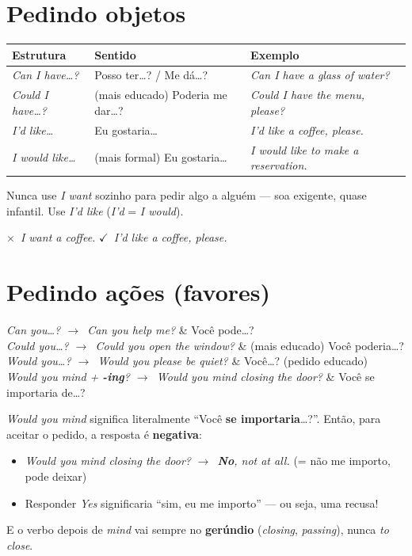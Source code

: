 \documentclass[12pt,a4paper,oneside]{book}
\makeatletter
\newcommand{\en}[1]{\textit{#1}}                 %
\newcommand{\ok}{\textcolor{green!45!black}{$\checkmark$}}
\newcommand{\no}{\textcolor{red!70!black}{$\times$}}
\newcommand{\ra}{$\rightarrow$}
\newcommand{\fr}[2]{\en{#1} & #2 \\}
\newenvironment{frases}{\tabularx{\textwidth}{@{}>{\raggedright\arraybackslash}p{0.52\textwidth}X@{}}}{\endtabularx}
\makeatother
\begin{document}
\section{Pedindo objetos}

\begin{center}
\begin{tabularx}{\textwidth}{@{}lXl@{}}
\toprule
\textbf{Estrutura} & \textbf{Sentido} & \textbf{Exemplo} \\
\midrule
\en{Can I have\ldots?} & Posso ter\ldots? / Me dá\ldots? & \en{Can I have a glass of water?} \\
\en{Could I have\ldots?} & (mais educado) Poderia me dar\ldots? & \en{Could I have the menu, please?} \\
\en{I'd like\ldots}\index{I'd like} & Eu gostaria\ldots & \en{I'd like a coffee, please.} \\
\en{I would like\ldots} & (mais formal) Eu gostaria\ldots & \en{I would like to make a reservation.} \\
\bottomrule
\end{tabularx}
\end{center}

\begin{cuidado}
Nunca use \en{I want} sozinho para pedir algo a alguém --- soa exigente, quase infantil. Use \en{I'd like} (\en{I'd} = \en{I would}).

\no\ \en{I want a coffee.} \quad \ok\ \en{I'd like a coffee, please.}
\end{cuidado}

\section{Pedindo ações (favores)}

\begin{frases}
\fr{Can you\ldots? \ra\ \en{Can you help me?}}{Você pode\ldots?}
\fr{Could you\ldots? \ra\ \en{Could you open the window?}}{(mais educado) Você poderia\ldots?}
\fr{Would you\ldots? \ra\ \en{Would you please be quiet?}}{Você\ldots? (pedido educado)}
\fr{Would you mind + \textbf{-ing}? \ra\ \en{Would you mind closing the door?}}{Você se importaria de\ldots?}
\end{frases}

\begin{cuidado}
\en{Would you mind} significa literalmente ``Você \textbf{se importaria}\ldots?''. Então, para aceitar o pedido, a resposta é \textbf{negativa}:
\begin{itemize}
  \item \en{Would you mind closing the door?} \ra\ \en{\textbf{No}, not at all.} (= não me importo, pode deixar)
  \item Responder \en{Yes} significaria ``sim, eu me importo'' --- ou seja, uma recusa!
\end{itemize}
E o verbo depois de \en{mind} vai sempre no \textbf{gerúndio} (\en{closing}, \en{passing}), nunca \en{to close}.
\end{cuidado}
\end{document}

